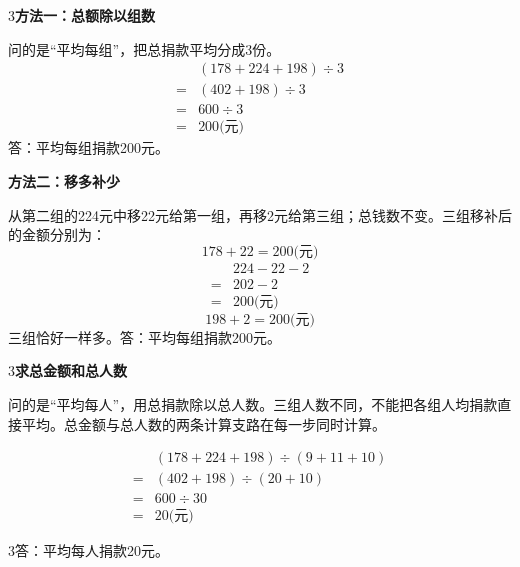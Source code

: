 \documentclass[multi=snippet,border={5bp 20bp 5bp 5bp}]{standalone}
\newenvironment{snippet}[3]{\begin{minipage}{#1bp}\color{answerred}\fontsize{#2}{#3}\selectfont\raggedright}{\end{minipage}}
\begin{document}
\begin{snippet}{505}{11.5}{14}\begin{multicols}{3}\raggedcolumns \textbf{方法一：总额除以组数}\par 问的是“平均每组”，把总捐款平均分成3份。\[\begin{aligned}&(178+224+198)\div3\\={}&(402+198)\div3\\={}&600\div3\\={}&200\text{(元)}\end{aligned}\]答：平均每组捐款200元。\par \textbf{方法二：移多补少}\par 从第二组的224元中移22元给第一组，再移2元给第三组；总钱数不变。三组移补后的金额分别为：\[178+22=200\text{(元)}\]\[\begin{aligned}&224-22-2\\={}&202-2\\={}&200\text{(元)}\end{aligned}\]\[198+2=200\text{(元)}\]三组恰好一样多。答：平均每组捐款200元。\end{multicols}\end{snippet}
\begin{snippet}{505}{11.5}{14}\begin{multicols}{3}\raggedcolumns \textbf{求总金额和总人数}\par 问的是“平均每人”，用总捐款除以总人数。三组人数不同，不能把各组人均捐款直接平均。总金额与总人数的两条计算支路在每一步同时计算。\end{multicols}\[\begin{aligned}&(178+224+198)\div(9+11+10)\\={}&(402+198)\div(20+10)\\={}&600\div30\\={}&20\text{(元)}\end{aligned}\]\begin{multicols}{3}\raggedcolumns 答：平均每人捐款20元。\end{multicols}\end{snippet}
\end{document}

